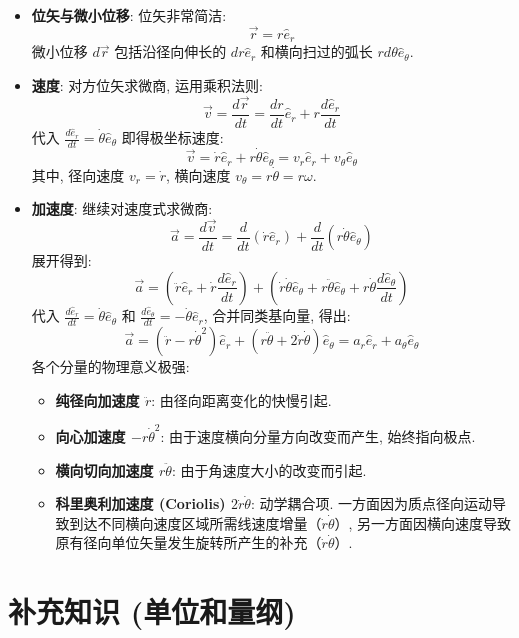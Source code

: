 \documentclass[
  a4paper,
]{ctexrep}
\providecommand{\tightlist}{%
  \setlength{\itemsep}{0pt}\setlength{\parskip}{0pt}}
\begin{document}
\begin{itemize}
\item
  \textbf{位矢与微小位移}: 位矢非常简洁: \[\vec{r} = r\hat{e}_r\]
  微小位移 \(d\vec{r}\) 包括沿径向伸长的 \(dr \hat{e}_r\)
  和横向扫过的弧长 \(r d\theta \hat{e}_\theta\).
\item
  \textbf{速度}: 对方位矢求微商, 运用乘积法则:
  \[\vec{v} = \frac{d\vec{r}}{dt} = \frac{dr}{dt}\hat{e}_r + r\frac{d\hat{e}_r}{dt}\]
  代入 \(\frac{d\hat{e}_r}{dt} = \dot{\theta}\hat{e}_\theta\)
  即得极坐标速度:
  \[\vec{v} = \dot{r}\hat{e}_r + r\dot{\theta}\hat{e}_\theta = v_r \hat{e}_r + v_\theta \hat{e}_\theta\]
  其中, 径向速度 \(v_r = \dot{r}\), 横向速度
  \(v_\theta = r\dot{\theta} = r\omega\).
\item
  \textbf{加速度}: 继续对速度式求微商:
  \[\vec{a} = \frac{d\vec{v}}{dt} = \frac{d}{dt}(\dot{r}\hat{e}_r) + \frac{d}{dt}(r\dot{\theta}\hat{e}_\theta)\]
  展开得到:
  \[\vec{a} = (\ddot{r}\hat{e}_r + \dot{r}\frac{d\hat{e}_r}{dt}) + (\dot{r}\dot{\theta}\hat{e}_\theta + r\ddot{\theta}\hat{e}_\theta + r\dot{\theta}\frac{d\hat{e}_\theta}{dt})\]
  代入 \(\frac{d\hat{e}_r}{dt} = \dot{\theta}\hat{e}_\theta\) 和
  \(\frac{d\hat{e}_\theta}{dt} = -\dot{\theta}\hat{e}_r\),
  合并同类基向量, 得出:
  \[\vec{a} = (\ddot{r} - r\dot{\theta}^2)\hat{e}_r + (r\ddot{\theta} + 2\dot{r}\dot{\theta})\hat{e}_\theta = a_r \hat{e}_r + a_\theta \hat{e}_\theta\]
  各个分量的物理意义极强:

  \begin{itemize}
  \tightlist
  \item
    \textbf{纯径向加速度 \(\ddot{r}\)}: 由径向距离变化的快慢引起.
  \item
    \textbf{向心加速度 \(-r\dot{\theta}^2\)}:
    由于速度横向分量方向改变而产生, 始终指向极点.
  \item
    \textbf{横向切向加速度 \(r\ddot{\theta}\)}:
    由于角速度大小的改变而引起.
  \item
    \textbf{科里奥利加速度 (Coriolis) \(2\dot{r}\dot{\theta}\)}:
    动学耦合项.
    一方面因为质点径向运动导致到达不同横向速度区域所需线速度增量（\(\dot{r}\dot{\theta}\)）,
    另一方面因横向速度导致原有径向单位矢量发生旋转所产生的补充（\(\dot{r}\dot{\theta}\)）.
  \end{itemize}
\end{itemize}

\section{补充知识
(单位和量纲)}\label{ux8865ux5145ux77e5ux8bc6-ux5355ux4f4dux548cux91cfux7eb2}
\end{document}
